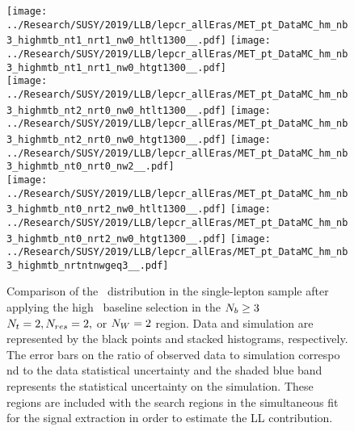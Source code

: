 \begin{figure}[!htb]
	\begin{center}
  \texttt{[image: ../Research/SUSY/2019/LLB/lepcr\_allEras/MET\_pt\_DataMC\_hm\_nb3\_highmtb\_nt1\_nrt1\_nw0\_htlt1300\_\_.pdf]} 
  \texttt{[image: ../Research/SUSY/2019/LLB/lepcr\_allEras/MET\_pt\_DataMC\_hm\_nb3\_highmtb\_nt1\_nrt1\_nw0\_htgt1300\_\_.pdf]} \\  
  \texttt{[image: ../Research/SUSY/2019/LLB/lepcr\_allEras/MET\_pt\_DataMC\_hm\_nb3\_highmtb\_nt2\_nrt0\_nw0\_htlt1300\_\_.pdf]} 
  \texttt{[image: ../Research/SUSY/2019/LLB/lepcr\_allEras/MET\_pt\_DataMC\_hm\_nb3\_highmtb\_nt2\_nrt0\_nw0\_htgt1300\_\_.pdf]} 
  \texttt{[image: ../Research/SUSY/2019/LLB/lepcr\_allEras/MET\_pt\_DataMC\_hm\_nb3\_highmtb\_nt0\_nrt0\_nw2\_\_.pdf]} \\
  \texttt{[image: ../Research/SUSY/2019/LLB/lepcr\_allEras/MET\_pt\_DataMC\_hm\_nb3\_highmtb\_nt0\_nrt2\_nw0\_htlt1300\_\_.pdf]} 
  \texttt{[image: ../Research/SUSY/2019/LLB/lepcr\_allEras/MET\_pt\_DataMC\_hm\_nb3\_highmtb\_nt0\_nrt2\_nw0\_htgt1300\_\_.pdf]} 
  \texttt{[image: ../Research/SUSY/2019/LLB/lepcr\_allEras/MET\_pt\_DataMC\_hm\_nb3\_highmtb\_nrtntnwgeq3\_\_.pdf]} \\
	\end{center}
	\caption{Comparison of the \met~distribution in the single-lepton sample after applying the high \dm~baseline selection in the $N_{b}\geq3$ $N_{t}=2, N_{res}=2,$ or $N_{W}=2$ region. Data and simulation are represented by the black points and stacked histograms, respectively. The error bars on the ratio of observed data to simulation correspo    nd to the data statistical uncertainty and the shaded blue band represents the statistical uncertainty on the simulation. These regions are included with the search regions in the simultaneous fit for the signal extraction in order to estimate the LL contribution.
	 }
	\label{fig:llb-1lcr-datavsmc-hm-nb3-2}
\end{figure}
